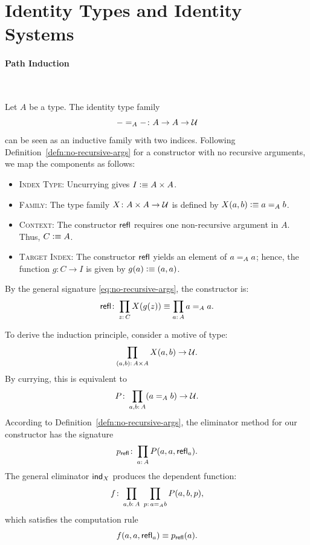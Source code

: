 \section{Identity Types and Identity Systems}

\paragraph{Path Induction}\ 

Let $A$ be a type. The identity type family
\[
    \dummy\eq A\dummy\colon A\to A\to\univ 
\]
can be seen as an inductive family with two indices. Following Definition~\ref{defn:no-recursive-args} for a constructor with no recursive arguments, we map the components as follows:

\begin{itemize}
    \item \textsc{Index Type:} Uncurrying gives $I\mathrel{\vcentcolon}\equiv A\times A$.
    
    \item \textsc{Family:} The type family $X\colon A\times A\to\univ$ is defined by $X(a,b)\mathrel{\vcentcolon}\equiv a\mathrel{=_{A}}b$.
    
    \item \textsc{Context:} The constructor $\mathsf{refl}$ requires one non-recursive argument in $A$. Thus, $C\mathrel{\vcentcolon}\equiv A$.
    
    \item \textsc{Target Index:} The constructor $\mathsf{refl}$ yields an element of $a\mathrel{=_{A}} a$; hence, the function $g\colon C\to I$ is given by $g(a)\mathrel{\vcentcolon}\equiv(a,a)$.
\end{itemize}

By the general signature \eqref{eq:no-recursive-args}, the constructor is:
\[
    \fun{refl}\colon\prod_{z\colon C}X(g(z))
        \equiv\prod_{a\colon A}a\eq Aa.
\]

To derive the induction principle, consider a motive of type:
\[
    \prod_{(a,b)\colon A\times A}X(a,b)\to\univ.
\]
By currying, this is equivalent to
\[
    P\colon\prod_{a,b\colon A}(a\eq Ab)\to\univ.
\]
According to Definition~\ref{defn:no-recursive-args}, the eliminator method for our constructor has the signature
\[
    p_{\fun{refl}}\colon\prod_{a\colon A}P(a,a,\fun{refl}_a).
\]
The general eliminator $\mathsf{ind}_X$ produces the dependent function:
\[
    f\colon
        \prod_{a,b\colon A}\;
        \prod_{p\colon a\eq Ab}
        P(a,b,p),
\]
which satisfies the computation rule
\[
    f(a,a,\mathsf{refl}_a)\equiv p_{\mathsf{refl}}(a).
\]

